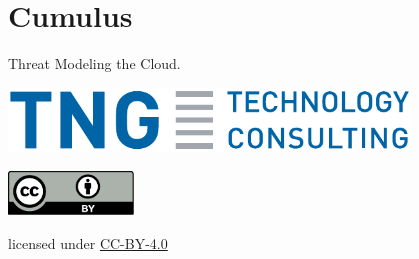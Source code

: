 %

\hspace{0.1\textheight}
\section*{Cumulus}
\makeatletter{}

Threat Modeling the Cloud.

\vspace*{0.2\textheight}
\hspace*{\fill}
\includegraphics[width=0.8\textwidth]{img/tng.pdf}

\vfill
\hspace*{\fill}
\includegraphics[width=0.25\textwidth]{img/cc-by.pdf}
\begin{tiny}
  licensed under \href{https://creativecommons.org/licenses/by/4.0/}{CC-BY-4.0}
\end{tiny}
